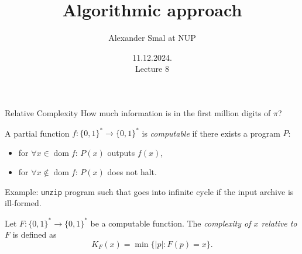 \documentclass[aspectratio=169]{beamer}
\title{Algorithmic approach}
\author{Alexander Smal at NUP}
\date{11.12.2024.\\ Lecture 8}
\newcommand{\bits}{\{0,1\}}
\newcommand{\bitstr}{\bits^*}
\DeclareMathOperator{\dom}{dom}
\begin{document}
\begin{frame}[plain]
    \maketitle
\end{frame}

\begin{frame}{Relative Complexity}
How much information is in the first million digits of $\pi$?

\pause
\begin{definition}
    A partial function $f:\bitstr\to\bitstr$ is \emph{computable} if there exists a program $P$:
    \begin{itemize}
        \item for $\forall x \in \dom f$: $P(x)$ outputs $f(x)$,
        \item for $\forall x \not\in \dom f$: $P(x)$ does not halt.
    \end{itemize}
\end{definition}

\pause
Example: \texttt{unzip} program such that goes into infinite cycle if the input archive is ill-formed.

\pause
\begin{definition}
    Let $F:\bitstr\to\bitstr$ be a computable function. The \emph{complexity of $x$ relative to $F$} is defined as
    \[K_F(x) = \min\{|p| : F(p) = x\}.\]
\end{definition}
\end{frame}


\end{document}
